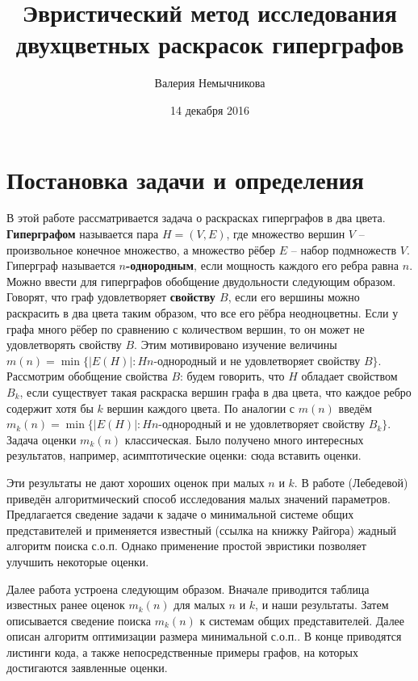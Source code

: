 \documentclass{article}
\title{Эвристический метод исследования двухцветных раскрасок гиперграфов}
\author{Валерия Немычникова}
\date{14 декабря 2016}
\begin{document}
	\maketitle
	\section{Постановка задачи и определения}
	
		
		В этой работе рассматривается задача о раскрасках гиперграфов в два цвета.\\
	 \textbf{Гиперграфом} называется пара $H = (V, E)$, где множество вершин $V$ -- произвольное конечное множество, а множество рёбер $E$ -- набор подмножеств $V$. Гиперграф называется \textbf{$n$-однородным}, если мощность каждого его ребра равна $n$. \\
	 Можно ввести для гиперграфов обобщение двудольности следующим образом. Говорят, что граф удовлетворяет \textbf{свойству $B$}, если его вершины можно раскрасить в два цвета таким образом, что все его рёбра неодноцветны. Если у графа много рёбер по сравнению с количеством вершин, то он может не удовлетворять свойству $B$. Этим мотивировано изучение величины $m(n) = \min\{|E(H)| : H n$-однородный и не удовлетворяет свойству $B\}$.\\
	Рассмотрим обобщение свойства $B$: будем говорить, что $H$ обладает свойством $B_k$, если существует такая раскраска вершин графа в два цвета, что каждое ребро содержит хотя бы $k$ вершин каждого цвета. По аналогии с $m(n)$ введём $m_k(n) = \min\{|E(H)| : H n$-однородный и не удовлетворяет свойству $B_k\}$.\\
    Задача оценки $m_k(n)$ классическая. Было получено много интересных результатов, например, асимптотические оценки:
        сюда вставить оценки.

    Эти результаты не дают хороших оценок при малых $n$ и $k$.
    В работе (Лебедевой) приведён алгоритмический способ исследования малых значений параметров. Предлагается сведение задачи к задаче о минимальной системе общих представителей и применяется известный (ссылка на книжку Райгора) жадный алгоритм поиска с.о.п. Однако применение простой эвристики позволяет улучшить некоторые оценки. 

    Далее работа устроена следующим образом. Вначале приводится таблица известных ранее оценок $m_k(n)$ для малых $n$ и $k$, и наши результаты. Затем описывается сведение поиска $m_k(n)$ к системам общих представителей. Далее описан алгоритм оптимизации размера минимальной с.о.п.. В конце приводятся листинги кода, а также непосредственные примеры графов, на которых достигаются заявленные оценки.
	
\end{document}
